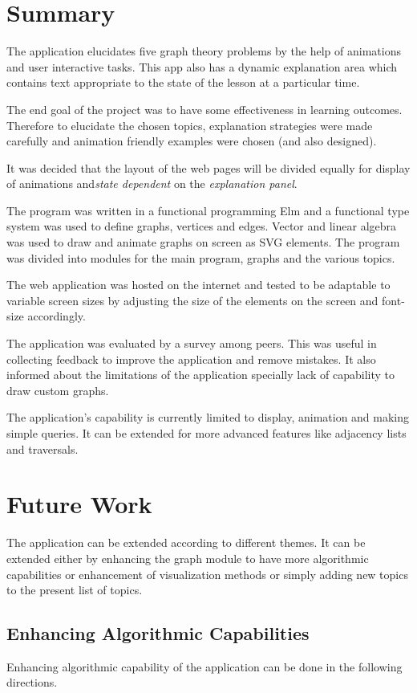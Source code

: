 \section{Summary}

The application elucidates five graph theory problems by the help of animations
and user interactive tasks. This app also has a dynamic explanation area
which contains text appropriate to the state of the lesson at a particular
time.

The end goal of the project was to have some effectiveness in learning
outcomes. Therefore to elucidate the chosen topics, explanation strategies
were made carefully and animation friendly examples were chosen (and also designed). 

It was decided that the layout of the web pages will be divided equally for
display of animations and\emph{state dependent} on the \emph{explanation
panel}.

The program was written in a functional programming Elm and a functional type system was used to define graphs, vertices and edges.  Vector
and linear algebra was used to draw and animate graphs on screen as SVG
elements. The program was divided into modules for the main program, graphs and
the various topics.

The web application was hosted on the internet and tested to be adaptable to variable
screen sizes by
adjusting the size of the elements on the screen and font-size accordingly. 

The application was evaluated by a survey among peers. This was useful in
collecting feedback to improve the application and remove mistakes. It also
informed about the limitations of the application specially lack of capability
to draw custom graphs.

The application's capability is currently limited to display, animation and
making simple queries. It can be extended for more advanced features like
adjacency lists and traversals. 


\section{Future Work}

The application can be extended according to different themes. It can be
extended either by enhancing the graph module to have more algorithmic
capabilities or enhancement of visualization methods or simply adding new
topics to the present list of topics.

\subsection{Enhancing Algorithmic Capabilities} 
Enhancing algorithmic capability of the application can be done in the
following directions.

